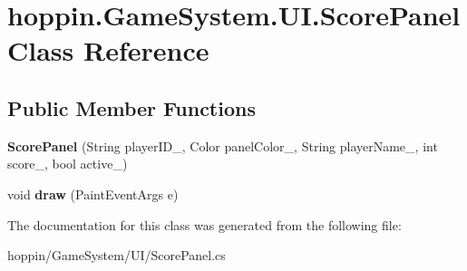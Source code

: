 \hypertarget{classhoppin_1_1_game_system_1_1_u_i_1_1_score_panel}{}\section{hoppin.\+Game\+System.\+U\+I.\+Score\+Panel Class Reference}
\label{classhoppin_1_1_game_system_1_1_u_i_1_1_score_panel}
\subsection*{Public Member Functions}
\begin{DoxyCompactItemize}
\item 
{\bfseries Score\+Panel} (String player\+I\+D\+\_\+, Color panel\+Color\+\_\+, String player\+Name\+\_\+, int score\+\_\+, bool active\+\_\+)\hypertarget{classhoppin_1_1_game_system_1_1_u_i_1_1_score_panel_a369891b4ec6f521459b4763814eebe91}{}\label{classhoppin_1_1_game_system_1_1_u_i_1_1_score_panel_a369891b4ec6f521459b4763814eebe91}

\item 
void {\bfseries draw} (Paint\+Event\+Args e)\hypertarget{classhoppin_1_1_game_system_1_1_u_i_1_1_score_panel_a7a983d672c7042c5ea7641b5b737e0ad}{}\label{classhoppin_1_1_game_system_1_1_u_i_1_1_score_panel_a7a983d672c7042c5ea7641b5b737e0ad}

\end{DoxyCompactItemize}


The documentation for this class was generated from the following file\+:\begin{DoxyCompactItemize}
\item 
hoppin/\+Game\+System/\+U\+I/Score\+Panel.\+cs\end{DoxyCompactItemize}
